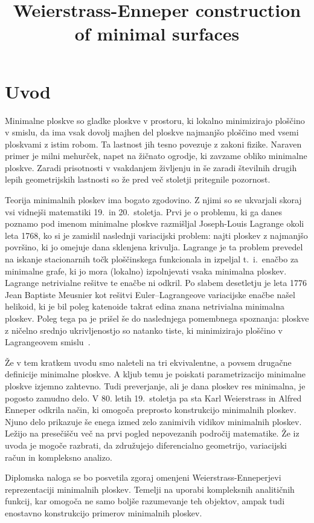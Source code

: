 \documentclass[fin1, tisk, bibtex]{fmfdelo}
\title{Weierstrass-Enneper construction of minimal surfaces}
\begin{document}
\section{Uvod}

Minimalne ploskve so gladke ploskve v prostoru, ki lokalno minimizirajo ploščino v smislu, da ima vsak dovolj majhen del ploskve najmanjšo ploščino med vsemi ploskvami z istim robom. Ta lastnost jih tesno povezuje z zakoni fizike. Naraven primer je milni mehurček, napet na žičnato ogrodje, ki zavzame obliko minimalne ploskve. Zaradi prisotnosti v vsakdanjem življenju in še zaradi številnih drugih lepih geometrijskih lastnosti so že pred več stoletji pritegnile pozornost.

Teorija minimalnih ploskev ima bogato zgodovino. Z njimi so se ukvarjali skoraj vsi vidnejši matematiki 19.~in 20.~stoletja. Prvi je o problemu, ki ga danes poznamo pod imenom \glqq minimalne ploskve\grqq{} razmišljal Joseph-Louis Lagrange okoli leta 1768, ko si je zamislil naslednji variacijski problem: najti ploskev z najmanjšo površino, ki jo omejuje dana sklenjena krivulja. Lagrange je ta problem prevedel na iskanje stacionarnih točk ploščinskega funkcionala in izpeljal t.~i.~enačbo za minimalne grafe, ki jo mora (lokalno) izpolnjevati vsaka minimalna ploskev. Lagrange netrivialne rešitve te enačbe ni odkril.  Po slabem desetletju je leta 1776 Jean Baptiste Meusnier kot rešitvi Euler--Lagrangeove variacijske enačbe našel helikoid, ki je bil poleg katenoide takrat edina znana netrivialna minimalna ploskev. Poleg tega pa je prišel še do naslednjega pomembnega spoznanja: ploskve z ničelno srednjo ukrivljenostjo so natanko tiste, ki minimizirajo ploščino v Lagrangeovem smislu~\cite{enciklopedia}. 

Že v tem kratkem uvodu smo naleteli na tri ekvivalentne, a povsem drugačne definicije minimalne ploskve. A kljub temu je poiskati parametrizacijo minimalne ploskve izjemno zahtevno. Tudi preverjanje, ali je dana ploskev res minimalna, je pogosto zamudno delo. V 80. letih 19.~stoletja pa sta Karl Weierstrass in Alfred Enneper odkrila način, ki omogoča preprosto konstrukcijo minimalnih ploskev. Njuno delo prikazuje še enega izmed zelo zanimivih vidikov minimalnih ploskev. Ležijo na presečišču več na prvi pogled nepovezanih področij matematike. Že iz uvoda je mogoče razbrati, da združujejo diferencialno geometrijo, variacijski račun in kompleksno analizo.

Diplomska naloga se bo posvetila zgoraj omenjeni Weierstrass-Enneperjevi reprezentaciji minimalnih ploskev. Temelji na uporabi kompleksnih analitičnih funkcij, kar omogoča ne samo boljše razumevanje teh objektov, ampak tudi enostavno konstrukcijo primerov minimalnih ploskev.
\end{document}
